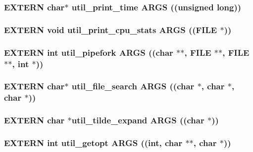 \subsubsection{\setlength{\rightskip}{0pt plus 5cm}EXTERN char$\ast$ util\_\-print\_\-time ARGS ((unsigned long))}\label{util_8h_bb3003d106ce154ee856eaf6dce104c2}


\subsubsection{\setlength{\rightskip}{0pt plus 5cm}EXTERN void util\_\-print\_\-cpu\_\-stats ARGS ((FILE $\ast$))}\label{util_8h_6a0b14577749cb3e7f424a266fcf55f3}


\subsubsection{\setlength{\rightskip}{0pt plus 5cm}EXTERN int util\_\-pipefork ARGS ((char $\ast$$\ast$, FILE $\ast$$\ast$, FILE $\ast$$\ast$, int $\ast$))}\label{util_8h_c0b5ddb0cf00582c82e2ba81297de48a}


\subsubsection{\setlength{\rightskip}{0pt plus 5cm}EXTERN char$\ast$ util\_\-file\_\-search ARGS ((char $\ast$, char $\ast$, char $\ast$))}\label{util_8h_639de6c42a2dcadaa8c934642ed4f17c}


\subsubsection{\setlength{\rightskip}{0pt plus 5cm}EXTERN char $\ast$util\_\-tilde\_\-expand ARGS ((char $\ast$))}\label{util_8h_5643f8725efe5fe69d9a66b4be864681}


\subsubsection{\setlength{\rightskip}{0pt plus 5cm}EXTERN int util\_\-getopt ARGS ((int, char $\ast$$\ast$, char $\ast$))}\label{util_8h_8f2e9ed79d0b162aac0d5a76840a6742}


